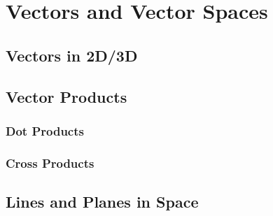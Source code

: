 \chapter{Vectors and Vector Spaces}

\section{Vectors in 2D/3D}

\section{Vector Products}
\subsection{Dot Products}
\subsection{Cross Products}

\section{Lines and Planes in Space}